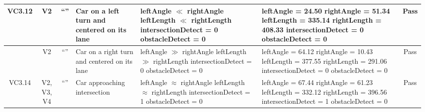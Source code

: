 \documentclass [10pt]{article}
\begin{document}
\begin{longtable}{ | p{ } | p{ } |  p{ } |  p{ } | p{ } | p{ } |  p{ } |}
    
    \multicolumn{1}{|c|}{VC3.12} 
    & \multicolumn{1}{c|}{V2}
    & \multicolumn{1}{c|}{``''}
    & Car on a left turn and centered on its lane
    & leftAngle $\ll$ rightAngle \newline
      leftLength $\ll$ rightLength \newline
      intersectionDetect = 0 \newline
      obstacleDetect = 0
    & leftAngle = 24.50 \newline
      rightAngle = 51.34 \newline
      leftLength = 335.14 \newline
      rightLength = 408.33 \newline
      intersectionDetect = 0 \newline
      obstacleDetect = 0 
    & \multicolumn{1}{c|}{Pass}\\ \hline
    
    
    \rowcolor{tableCell}\multicolumn{1}{|c|}{VC3.13} 
    & \multicolumn{1}{c|}{V2}
    & \multicolumn{1}{c|}{``''}
    & Car on a right turn and centered on its lane
    & leftAngle $\gg$ rightAngle \newline
      leftLength $\gg$ rightLength \newline
      intersectionDetect = 0 \newline
      obstacleDetect = 0
    & leftAngle = 64.12 \newline
      rightAngle = 10.43 \newline
      leftLength = 377.55 \newline
      rightLength = 291.06 \newline
      intersectionDetect = 0 \newline
      obstacleDetect = 0 
    & \multicolumn{1}{c|}{Pass}\\ \hline
    
    
    
    \multicolumn{1}{|c|}{VC3.14} 
    & \multicolumn{1}{c|}{V2, V3, V4}
    & \multicolumn{1}{c|}{``''}
    & Car approaching intersection
    & leftAngle $\approx$ rightAngle \newline
      leftLength $\approx$ rightLength \newline
      intersectionDetect = 1 \newline
      obstacleDetect = 0
    & leftAngle = 67.44 \newline
      rightAngle = 61.23 \newline
      leftLength = 332.12 \newline
      rightLength = 396.56 \newline
      intersectionDetect = 1 \newline
      obstacleDetect = 0 
    & \multicolumn{1}{c|}{Pass}\\ \hline
    

\end{longtable}
\end{document}
